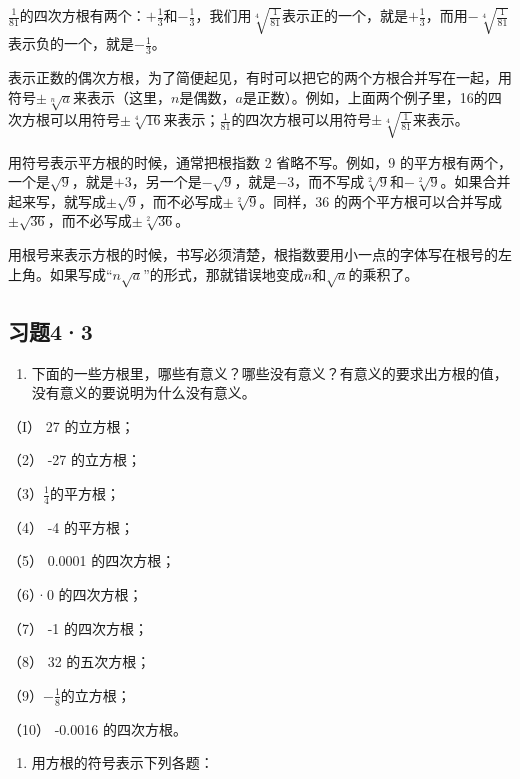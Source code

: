 \(\frac{1}{81}\)的四次方根有两个：\(+\frac{1}{3}\)和\(-\frac{1}{3}\)，我们用\(\sqrt[4]{\frac{1}{81}}\)表示正的一个，就是\(+\frac{1}{3}\)，而用\(-\sqrt[4]{\frac{1}{81}}\)表示负的一个，就是\(-\frac{1}{3}\)。

表示正数的偶次方根，为了简便起见，有时可以把它的两个方根合并写在一起，用符号\(\pm \sqrt[n]{a}\)来表示（这里，\(n\)是偶数，\(a\)是正数）。例如，上面两个例子里，16的四次方根可以用符号\(\pm \sqrt[4]{16}\)来表示；\(\frac{1}{81}\)的四次方根可以用符号±\(\sqrt[4]{\frac{1}{81}}\)来表示。

用符号表示平方根的时候，通常把根指数 2 省略不写。例如，9
的平方根有两个，一个是\(\sqrt{9}\)，就是\(+3\)，另一个是\(-\sqrt{9}\)，就是\(-3\)，而不写成\(\sqrt[2]{9}\)和\(-\sqrt[2]{9}\)。如果合并起来写，就写成\(\pm \sqrt{9}\)，而不必写成\(\pm \sqrt[2]{9}\)。同样，36
的两个平方根可以合并写成\(\pm \sqrt{36}\)，而不必写成\(\pm \sqrt[2]{36}\)。


用根号来表示方根的时候，书写必须清楚，根指数要用小一点的字体写在根号的左上角。如果写成``\(n\sqrt{a}\)''的形式，那就错误地变成\(n\)和\(\sqrt{a}\)的乘积了。

\subsection{习题4·3}

\begin{enumerate}
\item
  下面的一些方根里，哪些有意义？哪些没有意义？有意义的要求出方根的值，没有意义的要说明为什么没有意义。
\end{enumerate}

（I） 27 的立方根；

（2） -27 的立方根；

（3）\(\frac{1}{4}\)的平方根；

（4） -4 的平方根；

（5） 0.0001 的四次方根；

（6）·0 的四次方根；

（7） -1 的四次方根；

（8） 32 的五次方根；

（9）\(-\frac{1}{8}\)的立方根；

（10） -0.0016 的四次方根。

\begin{enumerate}[start=2]
\item
  用方根的符号表示下列各题：
\end{enumerate}

